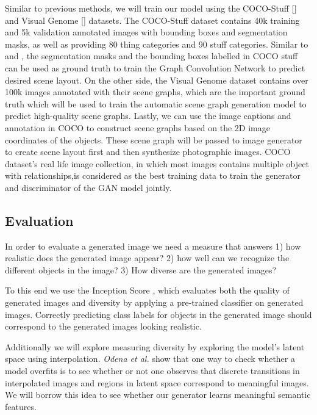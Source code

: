 \documentclass{article}
\begin{document}
Similar to previous methods, we will train our model using the COCO-Stuff [\cite{cocostuff}] and Visual Genome [\cite{visualgen}] datasets. The COCO-Stuff dataset contains 40k training and 5k validation annotated images with bounding boxes and segmentation masks, as well as providing 80 thing categories and 90 stuff categories. Similar to \cite{sg2im} and \cite{sg2imgcontext}, the segmentation masks and the bounding boxes labelled in COCO stuff can be used as ground truth to train the Graph Convolution Network to predict desired scene layout. On the other side, the Visual Genome dataset contains over 100k images annotated with their scene graphs, which are the important ground truth which will be used to train the automatic scene graph generation model to predict high-quality scene graphs. Lastly, we can use the image captions and annotation in COCO to construct scene graphs based on the 2D image coordinates of the objects. These scene graph will be passed to image generator to create scene layout first and then synthesize photographic images. COCO dataset's real life image collection, in which most images contains multiple object with relationships,is considered as the best training data to train the generator and discriminator of the GAN model jointly.  


\subsection{Evaluation}

In order to evaluate a generated image we need a measure that answers 1) how realistic does the generated image appear? 2) how well can we recognize the different objects in the image? 3) How diverse are the generated images?

To this end we use the Inception Score \cite{inception}, which evaluates both the quality of generated images and diversity by applying a pre-trained classifier on generated images. Correctly predicting class labels for objects in the generated image should correspond to the generated images looking realistic.

Additionally we will explore measuring diversity by exploring the model's latent space using interpolation. \textit{Odena et al.} \cite{auxgan} show that one way to check whether a model overfits is to see whether or not one observes that discrete transitions in interpolated images and regions in latent space correspond to meaningful images. We will borrow this idea to see whether our generator learns meaningful semantic features.
\end{document}
